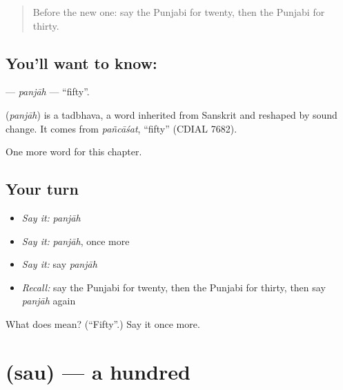 \label{lesson:PA-C96-panjah}



\begin{quote}
Before the new one: say the Punjabi for twenty, then the Punjabi for thirty.
\end{quote}

\subsection*{You'll want to know: }
\textbf{} — \emph{panjāh} — \textquotedblleft{}fifty\textquotedblright{}.

\begin{cousinweb}
\textbf{} (\emph{panjāh}) is a tadbhava, a word inherited from Sanskrit and reshaped by sound change. It comes from \emph{pañcāśat}, \textquotedblleft{}fifty\textquotedblright{} (CDIAL 7682).
\end{cousinweb}

\begin{grammarlens}[title={What you've built}]
One more word for this chapter.
\end{grammarlens}

\subsection*{Your turn}
\begin{itemize}
\raggedright
  \item \emph{Say it:} \emph{panjāh}
  \item \emph{Say it:} \emph{panjāh}, once more
  \item \emph{Say it:} say \emph{panjāh}
  \item \emph{Recall:} say the Punjabi for twenty, then the Punjabi for thirty, then say \emph{panjāh} again
\end{itemize}

\begin{tcolorbox}[breakable,colback=teal!4,colframe=teal!35!black,title={Before you move on}]
What does  mean? (\textquotedblleft{}Fifty\textquotedblright{}.) Say it once more.
\end{tcolorbox}
\section[\texorpdfstring{\pa{ਸੌ} (sau)}{ਸੌ (sau)}]{ (sau) — a hundred}

\label{lesson:PA-C96-sau}



